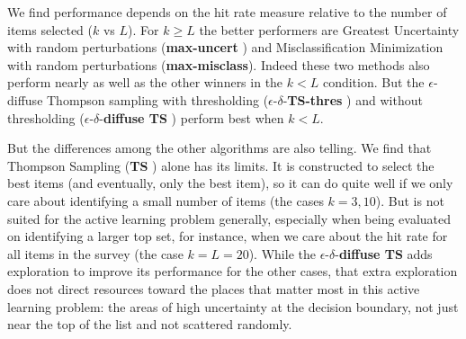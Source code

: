 \documentclass[a4paper,12pt]{article}
\newcommand{\mismin}{\textbf{max-misclass}}
\newcommand{\ts}{\textbf{TS} }
\newcommand{\edts}{$\epsilon$-$\delta$-\textbf{diffuse TS} }
\newcommand{\edtsthres}{$\epsilon$-$\delta$-\textbf{TS-thres} }
\newcommand{\uncert}{\textbf{max-uncert} }
\newcommand{\numperset}{L}
\begin{document}


We find performance depends on the hit rate measure relative to the number of items selected ($k$ vs $\numperset$).
For $k \ge L$ the better performers are Greatest Uncertainty with random perturbations (\uncert) and Misclassification Minimization with random perturbations (\mismin). Indeed these two methods also perform nearly as well as the other winners in the $k < L$ condition. But the $\epsilon$-diffuse Thompson sampling with thresholding (\edtsthres) and without thresholding (\edts) perform best when $k<L$. 

But the differences among the other algorithms are also telling. We find that Thompson Sampling (\ts) alone has its limits. It is constructed to select the best items (and eventually, only the best item), so it can do quite well if we only care about identifying a small number of items (the cases $k=3,10$). But is not suited for the active learning problem generally, especially when being evaluated on identifying a larger top set, for instance, when we care about the hit rate for all items in the survey (the case $k=L=20$). While the \edts adds exploration to improve its performance for the other cases, that extra exploration does not direct resources toward the places that matter most in this active learning problem: the areas of high uncertainty at the decision boundary, not just near the top of the list and not scattered randomly.  
\end{document}
